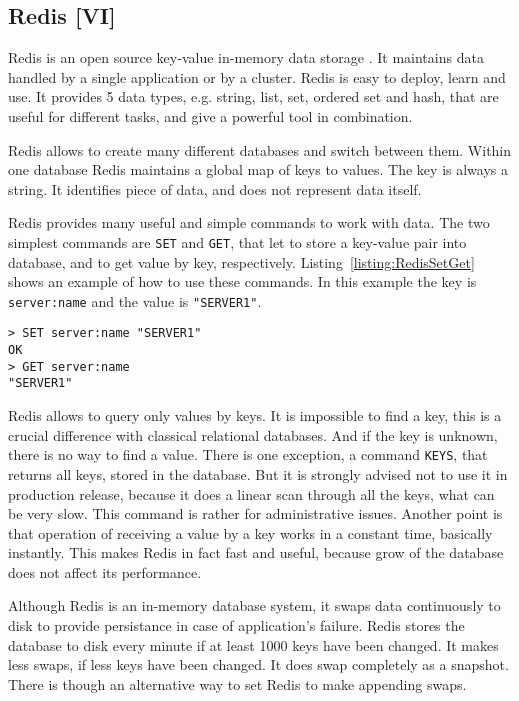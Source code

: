 \subsection{Redis [VI]}

Redis is an open source key-value in-memory data storage \cite{Seguin2012} \cite{Redis}.
It maintains data handled by a single application or by a cluster.
Redis is easy to deploy, learn and use.
It provides 5 data types, e.g. string, list, set, ordered set and hash, that are useful for different tasks, and give a powerful tool in combination.


Redis allows to create many different databases and switch between them.
Within one database Redis maintains a global map of keys to values.
The key is always a string.
It identifies piece of data, and does not represent data itself.

Redis provides many useful and simple commands to work with data.
The two simplest commands are \lstinline{SET} and \lstinline{GET}, that let to store a key-value pair into database, and to get value by key, respectively.
Listing~\ref{listing:RedisSetGet} shows an example of how to use these commands.
In this example the key is \lstinline{server:name} and the value is \lstinline{"SERVER1"}.

\begin{lstlisting}[float=h, caption=Example of usage of commands SET and GET., label=listing:RedisSetGet]
> SET server:name "SERVER1"
OK
> GET server:name
"SERVER1"
\end{lstlisting}

Redis allows to query only values by keys.
It is impossible to find a key, this is a crucial difference with classical relational databases.
And if the key is unknown, there is no way to find a value.
There is one exception, a command \lstinline{KEYS}, that returns all keys, stored in the database.
But it is strongly advised not to use it in production release, because it does a linear scan through all the keys, what can be very slow.
This command is rather for administrative issues.
Another point is that operation of receiving a value by a key works in a constant time, basically instantly.
This makes Redis in fact fast and useful, because grow of the database does not affect its performance.

Although Redis is an in-memory database system, it swaps data continuously to disk to provide persistance in case of application's failure.
Redis stores the database to disk every minute if at least 1000 keys have been changed.
It makes less swaps, if less keys have been changed.
It does swap completely as a snapshot.
There is though an alternative way to set Redis to make appending swaps.

